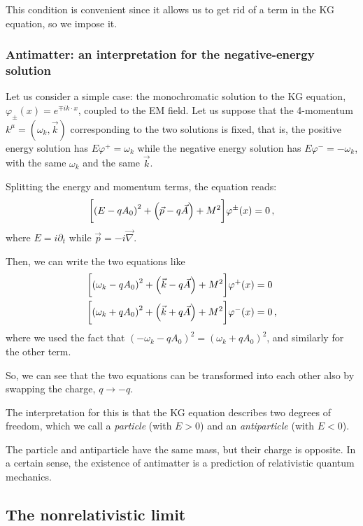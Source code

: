 \documentclass[main.tex]{subfiles}
\begin{document}
This condition is convenient since it allows us to get rid of a term in the KG equation, so we impose it. 

\subsubsection{Antimatter: an interpretation for the negative-energy solution}

Let us consider a simple case: the monochromatic solution to the KG equation, \(\varphi_{\pm} (x) = e^{\mp i k \cdot x}\), coupled to the EM field.
Let us suppose that the 4-momentum \(k^{\mu} = (\omega_{k}, \vec{k})\) corresponding to the two solutions is fixed, that is, the positive energy solution has \(E \varphi^{+} = \omega_{k}\) while the negative energy solution has \(E \varphi^{-} = - \omega_{k}\), with the same \(\omega_{k}\) and the same \(\vec{k}\). 

Splitting the energy and momentum terms, the equation reads: 
%
\begin{align}
\qty[\qty(E - q A_0 )^2 + \qty(\vec{p} - q \vec{A}) + M^2] \varphi^{\pm}(x) = 0
\,,
\end{align}
%
where \(E = i \partial_{t} \) while \(\vec{p} = - i \vec{\nabla}\). 

Then, we can write the two equations like 
%
\begin{subequations}
\begin{align}
\qty[\qty(\omega_{k} - q A_0 )^2 + \qty(\vec{k} - q \vec{A}) + M^2] \varphi^{+}(x) &= 0 \\
\qty[\qty(\omega_{k} + q A_0 )^2 + \qty(\vec{k} + q \vec{A}) + M^2] \varphi^{-}(x) &= 0 
\,,
\end{align}
\end{subequations}
%
where we used the fact that \((-\omega_{k} - q A_0 )^2 = (\omega_{k} + q A_0 )^2\), and similarly for the other term.  

So, we can see that the two equations can be transformed into each other also by swapping the charge, \(q \rightarrow -q\). 

The interpretation for this is that the KG equation describes two degrees of freedom, which we call a \emph{particle} (with \(E>0\)) and an \emph{antiparticle} (with \(E<0\)).

The particle and antiparticle have the same mass, but their charge is opposite. 
In a certain sense, the existence of antimatter is a prediction of relativistic quantum mechanics. 

\subsection{The nonrelativistic limit}
\end{document}
